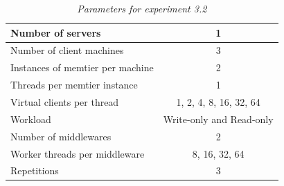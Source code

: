 \documentclass[11pt,a4paper]{article}
\begin{document}
	\begin{table}[H]
	\centering
		\begin{tabular}{|l|c|}
			\hline Number of servers                				& 1                        \\ 
			\hline Number of client machines        		& 3                        \\ 
			\hline Instances of memtier per machine 	& 2                        \\ 
			\hline Threads per memtier instance     		& 1                        \\
			\hline Virtual clients per thread       			& 1, 2, 4, 8, 16, 32, 64                 \\ 
			\hline Workload                         					& Write-only and Read-only \\
			\hline Number of middlewares            		& 2                        \\
			\hline Worker threads per middleware    	& 8, 16, 32, 64                 \\
			\hline Repetitions                      					& 3       \\ 
			\hline 
		\end{tabular}
		\caption{\textit{Parameters for experiment 3.2}}
		\label{Table:3_2_table}
	\end{table}


\end{document}
